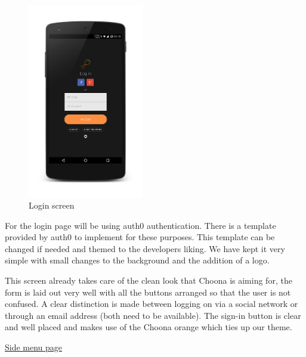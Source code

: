 \noindent
\begin{figure}[h!]
\centering
\includegraphics[width=0.45\textwidth]{./img/loginframed.png}
\caption{Login screen}
\label{fig:loginscreen}
\end{figure}

For the login page will be using auth0 authentication.  There is a template provided by auth0 to implement for these purposes. This template can be changed if needed and themed to the developers liking.  We have kept it very simple with small changes to the background and the addition of a logo.

This screen already takes care of the clean look that Choona is aiming for, the form is laid out very well with all the buttons arranged so that the user is not confused. A clear distinction is made between logging on via a social network or through an email address (both need to be available). The sign-in button is clear and well placed and makes use of the Choona orange which ties up our theme.\\

\clearpage

\noindent\underline{Side menu page}\newline


